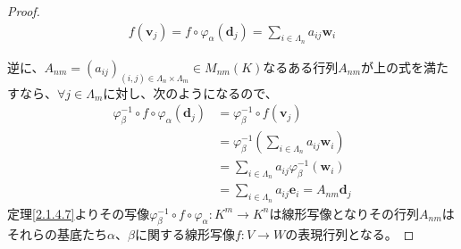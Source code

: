 \documentclass[dvipdfmx]{jsarticle}
\begin{document}
\begin{proof}
\begin{align*}
f\left( \mathbf{v}_{j} \right) = f \circ \varphi_{\alpha}\left( \mathbf{d}_{j} \right) = \sum_{i \in \varLambda_{n}} {a_{ij}\mathbf{w}_{i}}
\end{align*}\par
逆に、$A_{nm} = \left( a_{ij} \right)_{(i,j) \in \varLambda_{n} \times \varLambda_{m}} \in M_{nm}(K)$なるある行列$A_{nm}$が上の式を満たすなら、$\forall j \in \varLambda_{m}$に対し、次のようになるので、
\begin{align*}
\varphi_{\beta}^{- 1} \circ f \circ \varphi_{\alpha}\left( \mathbf{d}_{j} \right) &= \varphi_{\beta}^{- 1} \circ f\left( \mathbf{v}_{j} \right)\\
&= \varphi_{\beta}^{- 1}\left( \sum_{i \in \varLambda_{n}} {a_{ij}\mathbf{w}_{i}} \right)\\
&= \sum_{i \in \varLambda_{n}} {a_{ij}\varphi_{\beta}^{- 1}\left( \mathbf{w}_{i} \right)}\\
&= \sum_{i \in \varLambda_{n}} {a_{ij}\mathbf{e}_{i}} = A_{nm}\mathbf{d}_{j}
\end{align*}
定理\ref{2.1.4.7}よりその写像$\varphi_{\beta}^{- 1} \circ f \circ \varphi_{\alpha}:K^{m} \rightarrow K^{n}$は線形写像となりその行列$A_{nm}$はそれらの基底たち$\alpha$、$\beta$に関する線形写像$f:V \rightarrow W$の表現行列となる。
\end{proof}
\end{document}
